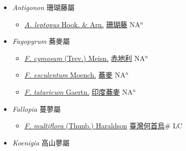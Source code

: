 
  \begin{itemize}
 \item[] \textit{Antigonon} 珊瑚藤屬
                    
  \begin{itemize}
        \item[] \href{http://www.theplantlist.org/tpl1.1/search?q=Antigonon+leptopus}{\textit{A. leptopus} Hook. \& Arn.}   \href{\detokenize{http://taibnet.sinica.edu.tw/chi/taibnet_species_list.php?T2=珊瑚藤&T2_new_value=true&fr=y}}{珊瑚藤} NA$^n$
  \end{itemize}
 \item[] \textit{Fagopyrum} 蕎麥屬
                    
  \begin{itemize}
        \item[] \href{http://www.theplantlist.org/tpl1.1/search?q=Fagopyrum+cymosum}{\textit{F. cymosum} (Trev.) Meisn.}   \href{\detokenize{http://taibnet.sinica.edu.tw/chi/taibnet_species_list.php?T2=赤地利&T2_new_value=true&fr=y}}{赤地利} NA$^n$
        \item[] \href{http://www.theplantlist.org/tpl1.1/search?q=Fagopyrum+esculentum}{\textit{F. esculentum} Moench.}   \href{\detokenize{http://taibnet.sinica.edu.tw/chi/taibnet_species_list.php?T2=蕎麥&T2_new_value=true&fr=y}}{蕎麥} NA$^n$
        \item[] \href{http://www.theplantlist.org/tpl1.1/search?q=Fagopyrum+tataricum}{\textit{F. tataricum} Gaertn.}   \href{\detokenize{http://taibnet.sinica.edu.tw/chi/taibnet_species_list.php?T2=印度蕎麥&T2_new_value=true&fr=y}}{印度蕎麥} NA$^n$
  \end{itemize}
 \item[] \textit{Fallopia} 蔓蓼屬
                    
  \begin{itemize}
        \item[] \href{http://www.theplantlist.org/tpl1.1/search?q=Fallopia+multiflora}{\textit{F. multiflora} (Thunb.) Haraldson}     \href{\detokenize{http://taibnet.sinica.edu.tw/chi/taibnet_species_list.php?T2=臺灣何首烏&T2_new_value=true&fr=y}}{臺灣何首烏}\# LC
  \end{itemize}
 \item[] \textit{Koenigia} 高山蓼屬
                    

\end{itemize}

